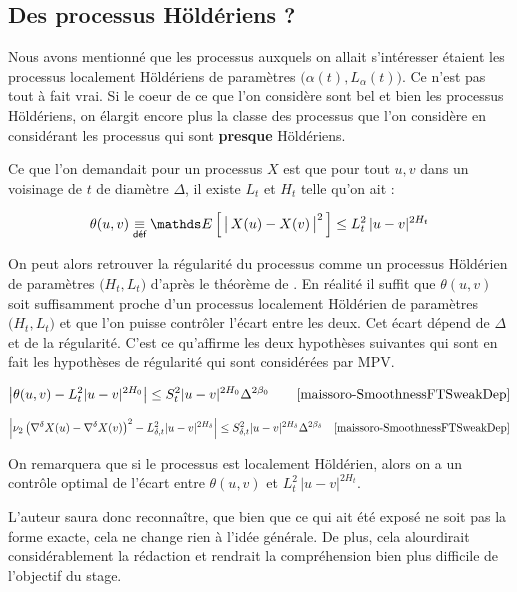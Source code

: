 \subsection{Des processus Höldériens ?}


Nous avons mentionné que les processus auxquels on allait s'intéresser étaient les processus localement Höldériens de paramètres $\bigl(\alpha(t), L_\alpha(t)\bigr)$. Ce n'est pas tout à fait vrai. Si le coeur de ce que l'on considère sont bel et bien les processus Höldériens, on élargit encore plus la classe des processus que l'on considère en considérant les processus qui sont \textbf{presque} Höldériens.



Ce que l'on demandait pour un processus $X$ est que pour tout $u,v$ dans un voisinage de $t$ de diamètre $\Delta$, il existe  $L_t$ et $H_t$ telle qu'on ait  :

\begin{equation*}
	\theta(u,v) \isdef \esperance{ \bigl\vert \, X(u) - X(v) \, \bigr\vert^2 } \leq L_t^2 \, \vert u - v \vert^{2 H_t}
\end{equation*}

On peut alors retrouver la régularité du processus comme un processus Höldérien de paramètres $\bigl(H_t, L_t\bigr)$ d'après le théorème de . En réalité il suffit que $\theta(u,v)$ soit suffisamment proche d'un processus localement Höldérien de paramètres $\bigl(H_t, L_t\bigr)$ et que l'on puisse contrôler l'écart entre les deux. Cet écart dépend de $\Delta$ et de la régularité. C'est ce qu'affirme les deux hypothèses suivantes qui sont en fait les hypothèses de régularité qui sont considérées par MPV\cite{maissoro-SmoothnessFTSweakDep}.

\begin{equation*}
	\bigl\vert \theta(u,v)-L_{t}^{2}|u-v|^{2H_{0}}\bigr\vert\leq S_{t}^{2}|u-v|^{2H_{0}}\Delta^{2\beta_{0}} \qquad \cite[H6]{maissoro-SmoothnessFTSweakDep}
\end{equation*}

\begin{equation*}
	\left|\nu_{2}\left(\nabla^{\delta}X(u)-\nabla^{\delta}X(v)\right)^{2}-L_{\delta,t}^{2}|u-v|^{2H_\delta}\right|\leq S_{\delta,t}^{2}|u-v|^{2H_\delta}\Delta^{2\beta_{\delta}} \quad \cite[D1-7]{maissoro-SmoothnessFTSweakDep}
\end{equation*}

\noindent On remarquera que si le processus est localement Höldérien, alors on a un contrôle optimal de l'écart entre $\theta(u,v)$ et $L_t^2 \, \vert u - v \vert^{2 H_t}$.

L'auteur saura donc reconnaître, que bien que ce qui ait été exposé ne soit pas la forme exacte, cela ne change rien à l'idée générale. De plus, cela alourdirait considérablement la rédaction et rendrait la compréhension bien plus difficile de l'objectif du stage.
